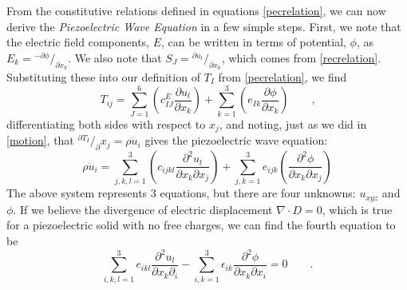 \documentclass[a4paper,10pt]{report}
\numberwithin{equation}{section}
\begin{document}
From the constitutive relations defined in equations \eqref{pecrelation}, we can now derive the \emph{Piezoelectric Wave Equation} in a few simple steps. First, we note that the electric field components, $E$, can be written in terms of potential, $\phi$, as $E_k = {}^{-\partial \phi}/_{\partial x_k}$. We also note that $S_J = {}^{\partial u_l}/_{\partial x_k}$, which comes from \eqref{recrelation}. Substituting these into our definition of $T_I$ from \eqref{pecrelation}, we find\cite[p.~26]{Ballantine1997}
\begin{equation}
T_{ij} = \sum_{J=1}^6 \left( c_{IJ}^E \frac{\partial u_l}{\partial x_k}\right) + \sum_{k=1}^3 \left( e_{Ik} \frac{\partial \phi}{\partial x_k} \right) \qquad \text{,}
\end{equation}
differentiating both sides with respect to $x_j$, and noting, just as we did in \eqref{motion}, that ${}^{\partial T_I} /_\partial x_j = \rho \ddot{u}_i$ gives the piezoelectric wave equation\cite[p.~27]{Ballantine1997}:
\begin{equation}\label{pwaveq}
\rho\ddot{u}_i = \sum_{j,k,l = 1}^3 \left( c_{ijkl} \frac{\partial^2 u_l}{\partial x_k \partial x_j} \right) 
+ \sum_{j,k=1}^3 e_{ijk}\left( \frac{\partial^2 \phi}{\partial x_k \partial x_j} \right)
\end{equation}
The above system represents 3 equations, but there are four unknowns: $u_{xyz}$ and $\phi$. If we believe the divergence of electric displacement $\nabla \cdot D = 0$, which is true for a piezoelectric solid with no free charges, we can find the fourth equation to be\cite[p.~27]{Ballantine1997}
\begin{equation}\label{pwaveq_phi}
\sum_{i,k,l=1}^3 e_{ikl}\frac{\partial^2 u_l}{\partial x_k \partial_i} - \sum_{i,k=1}^3 \epsilon_{ik} \frac{\partial^2 \phi}{\partial x_k \partial x_i} = 0 \qquad \text{.}
\end{equation}
\end{document}
